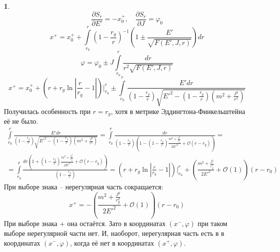 \documentclass[12pt]{article}
\theoremstyle{definition}
\newtheorem{zad}{}[section]
\begin{document}
\begin{zad}
\begin{equation}
\end{equation}
\begin{equation}
    \frac{\partial S_r}{\partial E'}=-x_0^+,\quad \frac{\partial S_r}{\partial J}=\varphi_0
\end{equation}
\begin{equation}
    \boxed{x^+=x^+_0+\int\limits_{r_0}^r\left(1-\frac{r_g}{r}\right)^{-1}\left(1\pm\frac{E'}{\sqrt{F(E',J,r)}}\right)dr}
\end{equation}
\begin{equation}
    \boxed{\varphi=\varphi_0\pm J\int\limits_{r_0}^r\frac{dr}{r^2\sqrt{F(E',J,r)}}}
\end{equation}
\begin{equation}
    x^+=x_0^++\left(r+r_g\ln\left|\frac{r}{r_g}-1\right|\right)\bigg|_{r_0}^r\pm\int\limits_{r_0}^r\frac{E'dr}{\left(1-\frac{r_g}{r}\right)\sqrt{E'^2-\left(1-\frac{r_g}{r}\right)\left(m^2+\frac{J^2}{r^2}\right)}}
\end{equation}
Получилась особенность при $r=r_g$, хотя в метрике Эддингтона-Финкельштейна её не было.
\begin{multline*}
    \int\limits_{r_0}^r\frac{E'dr}{\left(1-\frac{r_g}{r}\right)\sqrt{E'^2-\left(1-\frac{r_g}{r}\right)\left(m^2+\frac{J^2}{r^2}\right)}}=\int\limits_{r_0}^r\frac{dr}{\left(1-\frac{r_g}{r}\right)\left(1-\left(1-\frac{r_g}{r}\right)\frac{m^2+\frac{J^2}{r_g^2}}{2E'^2}+\mathcal{O}(r-r_g)\right)}=\\=\int\limits_{r_0}^r\frac{dr\left(1+\left(1-\frac{r_g}{r}\right)\frac{m^2+\frac{J^2}{r_g^2}}{2E'^2}+\mathcal{O}(r-r_g)\right)}{\left(1-\frac{r_g}{r}\right)}=\left(r+r_g\ln\left|\frac{r}{r_g}-1\right|\right)\bigg|_{r_0}^r+\left(\frac{m^2+\frac{J^2}{r_g^2}}{2E'^2}+\mathcal{O}(1)\right)(r-r_0)
\end{multline*}
При выборе знака -- нерегулярная часть сокращается:
\begin{equation}
    x^+=-\left(\frac{m^2+\frac{J^2}{r_g^2}}{2E'^2}+\mathcal{O}(1)\right)(r-r_0)
\end{equation}
При выборе знака + она остаётся. Зато в координатах $(x^-,\varphi)$ при таком выборе нерегулярной части нет. И, наоборот, нерегулярная часть есть в в координатах $(x^-,\varphi)$, когда её нет в координатах $(x^+,\varphi)$.
\end{zad}
\end{document}
